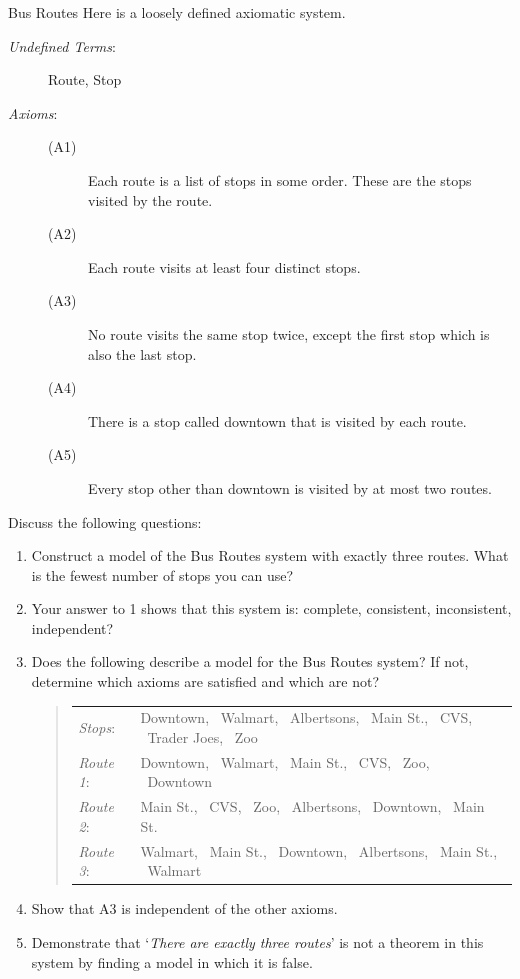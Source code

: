 \begin{example}{Bus Routes}{}
	Here is a loosely defined axiomatic system.
	\begin{description}
		\item[\normalfont\emph{Undefined Terms}:] Route, Stop
		\item[\normalfont\emph{Axioms}:]
		\begin{description}
			\item[\normalfont (A1)] Each route is a list of stops in some order. These are the stops visited by the route.
			\item[\normalfont (A2)] Each route visits at least four distinct stops.
			\item[\normalfont (A3)] No route visits the same stop twice, except the first stop which is also the last stop.
			\item[\normalfont (A4)] There is a stop called downtown that is visited by each route.
			\item[\normalfont (A5)] Every stop other than downtown is visited by at most two routes.
		\end{description}
	\end{description}
	
	Discuss the following questions:
	\begin{enumerate}
	  \item Construct a model of the Bus Routes system with exactly three routes. What is the fewest number of stops you can use?
	  \item Your answer to 1 shows that this system is: complete, consistent, inconsistent, independent?
	  \item Does the following describe a model for the Bus Routes system? If not, determine which axioms are satisfied and which are not?
	  \begin{quote}\def\arraystretch{1.2}
		  \begin{tabular}{@{}ll}
		    \emph{Stops}:&Downtown, \ Walmart, \ Albertsons, \ Main St., \ CVS, \ Trader Joes, \ Zoo\\
		  	\emph{Route 1}:&Downtown, \ Walmart, \ Main St., \ CVS, \ Zoo, \ Downtown\\
		  	\emph{Route 2}:&Main St., \ CVS, \ Zoo, \ Albertsons, \ Downtown, \ Main St.\\
		  	\emph{Route 3}:&Walmart, \ Main St., \ Downtown, \ Albertsons, \ Main St., \ Walmart
		  \end{tabular}
	  \end{quote}
		\item Show that A3 is independent of the other axioms.
		\item Demonstrate that `\emph{There are exactly three routes}' is not a theorem in this system by finding a model in which it is false.
	\end{enumerate}
\end{example}


